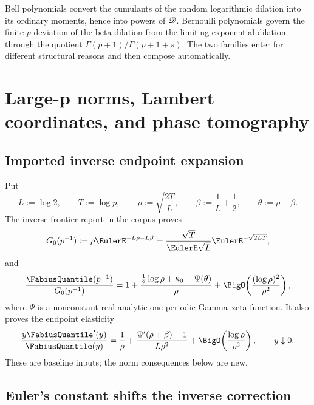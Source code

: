 \documentclass[11pt,oneside]{article}
\theoremstyle{definition}
\theoremstyle{remark}
\begin{document}
\begin{remark}
Bell polynomials convert the cumulants of the random logarithmic dilation into its ordinary
moments, hence into powers of $\mathscr D$.  Bernoulli polynomials govern the finite-$p$ deviation
of the beta dilation from the limiting exponential dilation through the quotient
$\Gamma(p+1)/\Gamma(p+1+s)$.  The two families enter for different structural reasons and
then compose automatically.
\end{remark}

\section{Large-p norms, Lambert coordinates, and phase tomography}
\label{p4:sec:large-p}

\subsection{Imported inverse endpoint expansion}

Put
\begin{equation}
 L:=\log2,
 \qquad T:=\log p,
 \qquad
 \rho:=\sqrt{\frac{2T}{L}},
 \qquad
 \beta:=\frac1L+\frac12,
 \qquad
 \theta:=\rho+\beta.
 \label{p4:eq:rho-beta-theta}
\end{equation}
The inverse-frontier report in the corpus proves
\begin{equation}
 G_0(p^{-1})
 :=\rho\EulerE^{-L\rho-L\beta}
 =\frac{\sqrt T}{\EulerE\sqrt L}\EulerE^{-\sqrt{2LT}},
 \label{p4:eq:G0-p}
\end{equation}
and
\begin{equation}
 \frac{\FabiusQuantile(p^{-1})}{G_0(p^{-1})}
 =1+\frac{\frac12\log\rho+\kappa_0-\Psi(\theta)}{\rho}
 +\BigO\!\left(\frac{(\log\rho)^2}{\rho^2}\right),
 \label{p4:eq:imported-G-expansion}
\end{equation}
where $\Psi$ is a nonconstant real-analytic one-periodic Gamma--zeta function.  It also proves
the endpoint elasticity
\begin{equation}
 \frac{y\FabiusQuantile'(y)}{\FabiusQuantile(y)}
 =\frac1\rho+\frac{\Psi'(\rho+\beta)-1}{L\rho^2}
 +\BigO\!\left(\frac{\log\rho}{\rho^3}\right),
 \qquad y\downarrow0.
 \label{p4:eq:imported-elasticity}
\end{equation}
These are baseline inputs; the norm consequences below are new.

\subsection{Euler's constant shifts the inverse correction}
\end{document}
